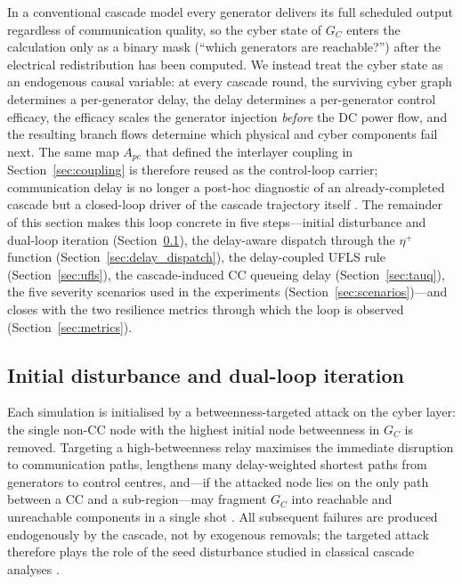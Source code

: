 In a conventional cascade model every generator delivers its full
scheduled output regardless of communication quality, so the cyber
state of $G_C$ enters the calculation only as a binary mask
(``which generators are reachable?'') after the electrical
redistribution has been computed.  We instead treat the cyber state
as an endogenous causal variable: at every cascade round, the
surviving cyber graph determines a per-generator delay, the delay
determines a per-generator control efficacy, the efficacy scales the
generator injection \emph{before} the DC power flow, and the
resulting branch flows determine which physical and cyber components
fail next.  The same map $A_{pc}$ that defined the interlayer
coupling in Section~\ref{sec:coupling} is therefore reused as the
control-loop carrier; communication delay is no longer a post-hoc
diagnostic of an already-completed cascade but a closed-loop driver
of the cascade trajectory itself
\citep{Buldyrev2010,Parshani2010,Cai2016TSG}.  The remainder of this
section makes this loop concrete in five steps---initial disturbance
and dual-loop iteration (Section~\ref{sec:cascade_loop}), the
delay-aware dispatch through the $\eta^{+}$ function
(Section~\ref{sec:delay_dispatch}), the delay-coupled UFLS rule
(Section~\ref{sec:ufls}), the cascade-induced CC queueing delay
(Section~\ref{sec:tauq}), the five severity scenarios used in the
experiments (Section~\ref{sec:scenarios})---and closes with the two
resilience metrics through which the loop is observed
(Section~\ref{sec:metrics}).

\subsection{Initial disturbance and dual-loop iteration}\label{sec:cascade_loop}

Each simulation is initialised by a betweenness-targeted attack on the
cyber layer: the single non-CC node with the highest initial node
betweenness in $G_C$ is removed.  Targeting a high-betweenness relay
maximises the immediate disruption to communication paths, lengthens
many delay-weighted shortest paths from generators to control centres,
and---if the attacked node lies on the only path between a CC and a
sub-region---may fragment $G_C$ into reachable and unreachable
components in a single shot \citep{Albert2000,Pagani2013}.  All
subsequent failures are produced endogenously by the cascade, not by
exogenous removals; the targeted attack therefore plays the role of
the seed disturbance studied in classical cascade analyses
\citep{Motter2002,Dobson2007}.

